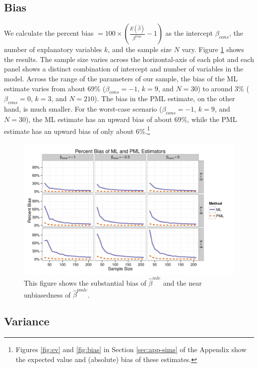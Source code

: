 \documentclass[12pt]{article}
\begin{document}
\subsection*{Bias}

We calculate the percent bias $= 100 \times \left(\frac{E(\hat{\beta})}{\beta^{true}} - 1 \right)$ as the intercept $\beta_{cons}$, the number of explanatory variables $k$, and the sample size $N$ vary.
Figure \ref{fig:sims-coef-perc-bias} shows the results.
The sample size varies across the horizontal-axis of each plot and each panel shows a distinct combination of intercept and number of variables in the model.
Across the range of the parameters of our sample, the bias of the ML estimate varies from about 69\% ($\beta_{cons} = -1$, $k = 9$, and $N = 30$) to around 3\% ($\beta_{cons} = 0$, $k = 3$, and $N = 210$).
The bias in the PML estimate, on the other hand, is much smaller.
For the worst-case scenario ($\beta_{cons} = -1$, $k = 9$, and $N = 30$), the ML estimate has an upward bias of about 69\%, while the PML estimate has an upward bias of only about 6\%.\footnote{Figures \ref{fig:ev} and \ref{fig:bias} in Section \ref{sec:app-sims} of the Appendix show the expected value and (absolute) bias of these estimates.}

\begin{figure}[h]
\begin{center}
\includegraphics[width = \textwidth]{figs/sims-percent-bias.pdf}
\caption{This figure shows the substantial bias of $\hat{\beta}^{mle}$ and the near unbiasedness of $\hat{\beta}^{pmle}$.}\label{fig:sims-coef-perc-bias}
\end{center}
\end{figure}

\subsection*{Variance}
\end{document}
